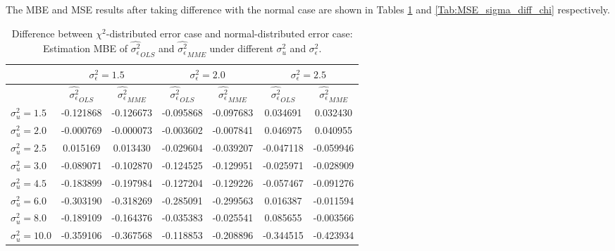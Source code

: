 \documentclass{article}
\begin{document}
The MBE and MSE results after taking difference with the normal case are shown in Tables \ref{Tab:MBE_sigma_diff_chi} and \ref{Tab:MSE_sigma_diff_chi} respectively. 

\begin{table}[ht]
    \centering
    \caption{Difference between $\chi^2$-distributed error case and normal-distributed error case: Estimation MBE of $\hat{\sigma^2_\epsilon}_{OLS}$ and $\hat{\sigma^2_\epsilon}_{MME}$ under different $\sigma^2_u$ and $\sigma^2_\epsilon$.}
    \label{Tab:MBE_sigma_diff_chi}
    \begin{tabular}[t]{lcccccc}
        \hline
        &\multicolumn{2}{c}{$\sigma^2_\epsilon=1.5$}&\multicolumn{2}{c}{$\sigma^2_\epsilon=2.0$}&\multicolumn{2}{c}{$\sigma^2_\epsilon=2.5$}\\
        \hline
        &$\hat{\sigma^2_\epsilon}_{OLS}$&$\hat{\sigma^2_\epsilon}_{MME}$&$\hat{\sigma^2_\epsilon}_{OLS}$&
        $\hat{\sigma^2_\epsilon}_{MME}$&$\hat{\sigma^2_\epsilon}_{OLS}$&$\hat{\sigma^2_\epsilon}_{MME}$\\
        \hline
        $\sigma^2_u = 1.5$&-0.121868&-0.126673&-0.095868&-0.097683&0.034691&0.032430\\
        $\sigma^2_u = 2.0$&-0.000769&-0.000073&-0.003602&-0.007841&0.046975&0.040955\\
        $\sigma^2_u = 2.5$&0.015169&0.013430&-0.029604&-0.039207&-0.047118&-0.059946\\
        $\sigma^2_u = 3.0$&-0.089071&-0.102870&-0.124525&-0.129951&-0.025971&-0.028909\\
        $\sigma^2_u = 4.5$&-0.183899&-0.197984&-0.127204&-0.129226&-0.057467&-0.091276\\
        $\sigma^2_u = 6.0$&-0.303190&-0.318269&-0.285091&-0.299563&0.016387&-0.011594\\
        $\sigma^2_u = 8.0$&-0.189109&-0.164376&-0.035383&-0.025541&0.085655&-0.003566\\
        $\sigma^2_u = 10.0$&-0.359106&-0.367568&-0.118853&-0.208896&-0.344515&-0.423934\\
        \hline
    \end{tabular}
\end{table}
\end{document}
